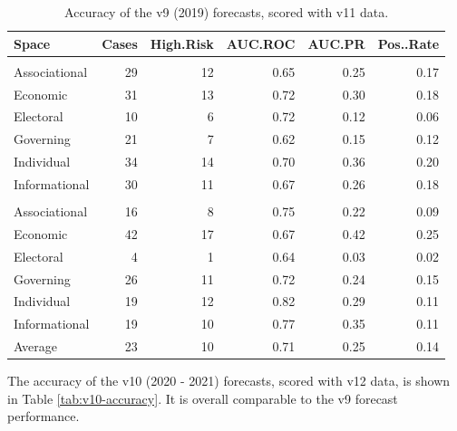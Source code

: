 \documentclass[
  11pt,
]{article}
\begin{document}
\begin{table}

\caption{\label{tab:v9-accuracy}Accuracy of the v9 (2019) forecasts, scored with v11 data.}
\centering
\begin{tabular}[t]{lrrrrr}
\toprule
Space & Cases & High.Risk & AUC.ROC & AUC.PR & Pos..Rate\\
\midrule
\addlinespace[0.3em]
\multicolumn{6}{l}{\textbf{Closing}}\\
\hspace{1em}Associational & 29 & 12 & 0.65 & 0.25 & 0.17\\
\hspace{1em}Economic & 31 & 13 & 0.72 & 0.30 & 0.18\\
\hspace{1em}Electoral & 10 & 6 & 0.72 & 0.12 & 0.06\\
\hspace{1em}Governing & 21 & 7 & 0.62 & 0.15 & 0.12\\
\hspace{1em}Individual & 34 & 14 & 0.70 & 0.36 & 0.20\\
\hspace{1em}Informational & 30 & 11 & 0.67 & 0.26 & 0.18\\
\addlinespace[0.3em]
\multicolumn{6}{l}{\textbf{Opening}}\\
\hspace{1em}Associational & 16 & 8 & 0.75 & 0.22 & 0.09\\
\hspace{1em}Economic & 42 & 17 & 0.67 & 0.42 & 0.25\\
\hspace{1em}Electoral & 4 & 1 & 0.64 & 0.03 & 0.02\\
\hspace{1em}Governing & 26 & 11 & 0.72 & 0.24 & 0.15\\
\hspace{1em}Individual & 19 & 12 & 0.82 & 0.29 & 0.11\\
\hspace{1em}Informational & 19 & 10 & 0.77 & 0.35 & 0.11\\
Average & 23 & 10 & 0.71 & 0.25 & 0.14\\
\bottomrule
\end{tabular}
\end{table}

The accuracy of the v10 (2020 - 2021) forecasts, scored with v12 data,
is shown in Table \ref{tab:v10-accuracy}. It is overall comparable to
the v9 forecast performance.
\end{document}
